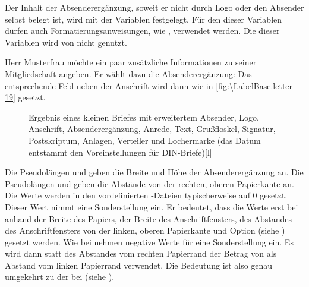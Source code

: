 \begin{Declaration}
\end{Declaration}
Der Inhalt der Absenderergänzung, soweit er nicht durch Logo oder den Absender
selbst belegt ist, wird mit der Variablen  festgelegt. Für
den  dieser Variablen dürfen auch Formatierungsanweisungen, wie
, verwendet werden. Die  dieser Variablen
wird von \KOMAScript{} nicht genutzt.

\begin{Example}
  Herr Musterfrau möchte ein paar zusätzliche Informationen zu seiner
  Mitgliedschaft angeben. Er wählt dazu die Absenderergänzung:%
  Das entsprechende Feld neben der Anschrift wird dann wie in
  \autoref{fig:\LabelBase.letter-19} gesetzt.
  \begin{figure}
    \setcapindent{0pt}%
    \begin{captionbeside}{Ergebnis
        eines kleinen Briefes mit erweitertem Absender, Logo, 
        Anschrift, Absenderergänzung, Anrede, Text, Grußfloskel, Signatur,
        Postskriptum, Anlagen, Verteiler und Lochermarke (das Datum entstammt
        den Voreinstellungen für DIN-Briefe)}[l]
    \end{captionbeside}
    \label{fig:\LabelBase.letter-19}
  \end{figure}
\end{Example}
%
\EndIndexGroup
\EndIndexGroup
\ExampleEndFix %


\begin{Declaration}
\end{Declaration}
Die Pseudolängen  und
 geben die Breite und
Höhe der Absenderergänzung an. Die Pseudolängen  und
 geben die Abstände von der rechten, oberen
Papierkante an. Die Werte werden in den vordefinierten -Dateien
typischerweise auf 0 gesetzt. Dieser Wert nimmt
eine Sonderstellung ein. Er bedeutet, dass die Werte erst bei
 anhand der Breite des
Papiers, der Breite des Anschriftfensters, des Abstandes des
Anschriftfensters von der linken, oberen Papierkante und
Option  (siehe
)
gesetzt werden. Wie bei  nehmen
negative Werte für  eine Sonderstellung ein. Es wird dann
statt des Abstandes vom rechten Papierrand der Betrag von 
als Abstand vom linken Papierrand verwendet. Die Bedeutung ist also genau
umgekehrt zu der bei  (siehe
).%
\EndIndexGroup
%
\EndIndexGroup


